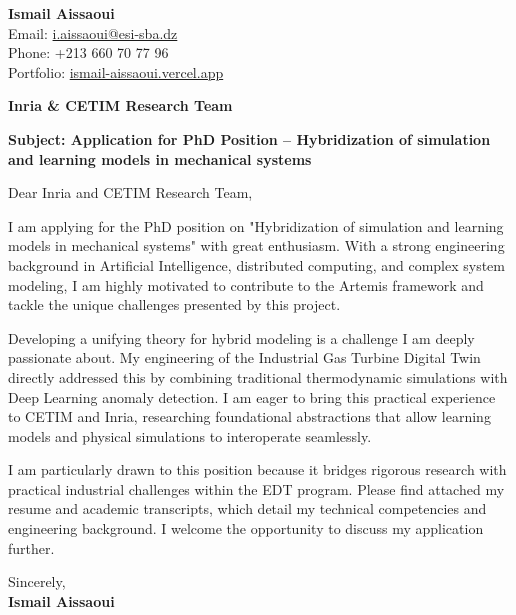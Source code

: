 \documentclass[11pt,a4paper]{article}
\begin{document}
\thispagestyle{empty}

\begin{flushright}
\textbf{Ismail Aissaoui} \\
Email: \href{mailto:i.aissaoui@esi-sba.dz}{i.aissaoui@esi-sba.dz} \\
Phone: +213 660 70 77 96 \\
Portfolio: \href{https://ismail-aissaoui.vercel.app}{ismail-aissaoui.vercel.app}
\end{flushright}

\vspace{1em}

\begin{flushleft}
\textbf{Inria \& CETIM Research Team}
\end{flushleft}

\vspace{1em}
\noindent\textbf{Subject: Application for PhD Position -- Hybridization of simulation and learning models in mechanical systems}
\vspace{1em}

\noindent Dear Inria and CETIM Research Team,

\vspace{1em}
\noindent
I am applying for the PhD position on "Hybridization of simulation and learning models in mechanical systems" with great enthusiasm. With a strong engineering background in Artificial Intelligence, distributed computing, and complex system modeling, I am highly motivated to contribute to the Artemis framework and tackle the unique challenges presented by this project.

\vspace{0.5em}
\noindent
Developing a unifying theory for hybrid modeling is a challenge I am deeply passionate about. My engineering of the Industrial Gas Turbine Digital Twin directly addressed this by combining traditional thermodynamic simulations with Deep Learning anomaly detection. I am eager to bring this practical experience to CETIM and Inria, researching foundational abstractions that allow learning models and physical simulations to interoperate seamlessly.

\vspace{0.5em}
\noindent
I am particularly drawn to this position because it bridges rigorous research with practical industrial challenges within the EDT program. Please find attached my resume and academic transcripts, which detail my technical competencies and engineering background. I welcome the opportunity to discuss my application further.

\vspace{1.5em}
\noindent
Sincerely, \\[0.5em]
\textbf{Ismail Aissaoui}
\end{document}
